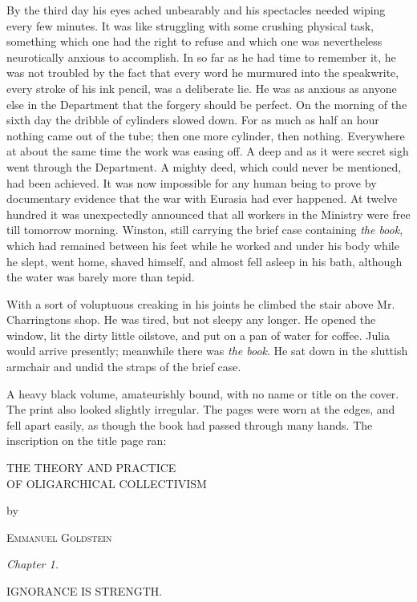 By the third day his eyes ached unbearably and his spectacles needed
wiping every few minutes. It was like struggling with some crushing
physical task, something which one had the right to refuse and which one
was nevertheless neurotically anxious to accomplish. In so far as he had
time to remember it, he was not troubled by the fact that every word he
murmured into the speakwrite, every stroke of his ink pencil, was a
deliberate lie. He was as anxious as anyone else in the Department that
the forgery should be perfect. On the morning of the sixth day the
dribble of cylinders slowed down. For as much as half an hour nothing
came out of the tube; then one more cylinder, then nothing. Everywhere
at about the same time the work was easing off. A deep and as it were
secret sigh went through the Department. A mighty deed, which could
never be mentioned, had been achieved. It was now impossible for any
human being to prove by documentary evidence that the war with Eurasia
had ever happened. At twelve hundred it was unexpectedly announced that
all workers in the Ministry were free till tomorrow morning. Winston,
still carrying the brief case containing \emph{the book}, which had
remained between his feet while he worked and under his body while he
slept, went home, shaved himself, and almost fell asleep in his bath,
although the water was barely more than tepid.

With a sort of voluptuous creaking in his joints he climbed the stair
above Mr. Charrington\textquotesingle s shop. He was tired, but not
sleepy any longer. He opened the window, lit the dirty little oilstove,
and put on a pan of water for coffee. Julia would arrive presently;
meanwhile there was \emph{the book}. He sat down in the sluttish
armchair and undid the straps of the brief case.

A heavy black volume, amateurishly bound, with no name or title on the
cover. The print also looked slightly irregular. The pages were worn at
the edges, and fell apart easily, as though the book had passed through
many hands. The inscription on the title page ran:

\begin{center}
THE THEORY AND PRACTICE\\
OF OLIGARCHICAL COLLECTIVISM

by

\textsc{Emmanuel Goldstein}
\end{center}
\begin{flushleft}
\end{flushleft}
\begin{center}
\emph{Chapter 1.}

IGNORANCE IS STRENGTH.
\end{center}


